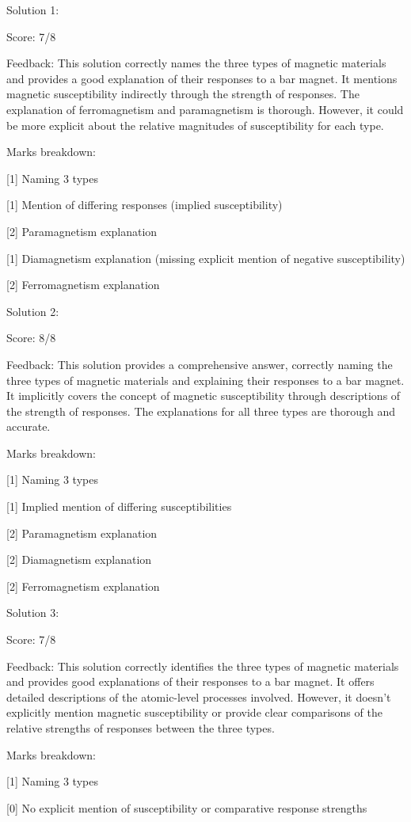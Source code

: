 \documentclass[a4paper,11pt]{article}
\begin{document}
Solution 1:

Score: 7/8

Feedback: This solution correctly names the three types of magnetic materials and provides a good explanation of their responses to a bar magnet. It mentions magnetic susceptibility indirectly through the strength of responses. The explanation of ferromagnetism and paramagnetism is thorough. However, it could be more explicit about the relative magnitudes of susceptibility for each type.

Marks breakdown:

[1] Naming 3 types

[1] Mention of differing responses (implied susceptibility)

[2] Paramagnetism explanation

[1] Diamagnetism explanation (missing explicit mention of negative susceptibility)

[2] Ferromagnetism explanation

Solution 2:

Score: 8/8

Feedback: This solution provides a comprehensive answer, correctly naming the three types of magnetic materials and explaining their responses to a bar magnet. It implicitly covers the concept of magnetic susceptibility through descriptions of the strength of responses. The explanations for all three types are thorough and accurate.

Marks breakdown:

[1] Naming 3 types

[1] Implied mention of differing susceptibilities

[2] Paramagnetism explanation

[2] Diamagnetism explanation

[2] Ferromagnetism explanation

Solution 3:

Score: 7/8

Feedback: This solution correctly identifies the three types of magnetic materials and provides good explanations of their responses to a bar magnet. It offers detailed descriptions of the atomic-level processes involved. However, it doesn't explicitly mention magnetic susceptibility or provide clear comparisons of the relative strengths of responses between the three types.

Marks breakdown:

[1] Naming 3 types

[0] No explicit mention of susceptibility or comparative response strengths
\end{document}
